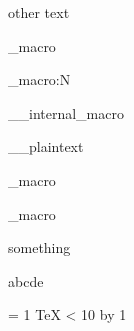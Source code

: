 \def\test{\dimen} other text



\internal_macro

\internal_macro:N

\__internal_macro

\__plaintext

\loop_macro

\new_macro



\if something \fi


 a\or b\or c\or d\else e\fi


 = 1
\loop
  \TeX
\ifnum{} < 10
\advance{} by 1
\repeat


